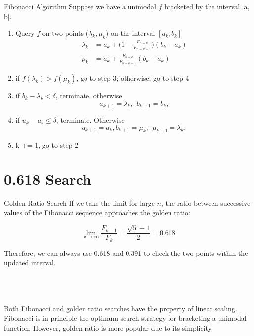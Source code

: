 \documentclass{beamer}
\begin{document}
\begin{frame}{Fibonacci Algorithm}
Suppose we have a unimodal $f$ bracketed by the interval [a, b].
\begin{enumerate}
    \item Query $f$ on two points ($\lambda_k, \mu_k$) on the interval $[a_k, b_k]$
    \begin{equation*}
    \begin{split}
        \lambda_k &= a_k + \bigg(1-\frac{F_{n-k}}{F_{n-k+1}}\bigg)(b_k - a_k)\\
        \mu_k &= a_k + \frac{F_{n-k}}{F_{n-k+1}}(b_k - a_k)        
    \end{split}
    \end{equation*}
    \item if $f(\lambda_k) > f(\mu_k)$, go to step 3; otherwise, go to step 4
    \item if $b_k - \lambda_k < \delta$, terminate. otherwise
    \begin{equation*}
        a_{k+1} = \lambda_k, ~~ b_{k+1} = b_k, 
    \end{equation*}
    \item if $u_k - a_k \leq \delta$, terminate. Otherwise
    \begin{equation*}
        a_{k+1} = a_k, b_{k+1} = \mu_k, ~~ \mu_{k+1} = \lambda_k, 
    \end{equation*}
    \item k += 1, go to step 2
\end{enumerate}
\end{frame}

\section{0.618 Search}

\begin{frame}{Golden Ratio Search}
If we take the limit for large $n$, the ratio between successive values of the Fibonacci sequence approaches the golden ratio:

\begin{equation*}
\lim_{n\rightarrow\infty} \frac{F_{k-1}}{F_k} = \frac{\sqrt{5}-1}{2} = 0.618
\end{equation*}

Therefore, we can always use 0.618 and 0.391 to check the two points within the updated interval.\\\\\\\

Both Fibonacci and golden ratio searches have the property of linear scaling. Fibonacci is in principle the optimum search strategy for bracketing a unimodal function. However, golden ratio is more popular due to its simplicity.

\end{frame}
\end{document}

